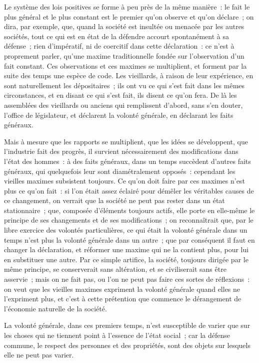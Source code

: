 \documentclass[french,twoside]{book} %
\begin{document}
Le système des lois positives se forme à peu près de la même manière : le fait le plus général et le plus constant est le premier qu’on observe et qu’on déclare ; on dira, par exemple, que, quand la société est insultée ou menacée par les autres sociétés, tout ce qui est en état de la défendre accourt spontanément à sa défense ; rien d’impératif, ni de coercitif dans cette déclaration : ce n’est à proprement parler, qu’une maxime traditionnelle fondée sur l’observation d’un fait constant. Ces observations et ces maximes se multiplient, et forment par la suite des temps une espèce de code. Les vieillards, à raison de leur expérience, en sont naturellement les dépositaires ; ils ont vu ce qui s’est fait dans les mêmes circonstances, et en disant ce qui s’est fait, ils disent ce qu’on fera. De là les assemblées des vieillards ou anciens qui remplissent d’abord, sans s’en douter, l’office de législateur, et déclarent la volonté générale, en déclarant les faits généraux.\par
Mais à mesure que les rapports se multiplient, que les idées se développent, que l’industrie fait des progrès, il survient nécessairement des modifications dans l’état des hommes : à des faits généraux, dans un temps succèdent d’autres faits généraux, qui quelquefois leur sont diamétralement opposés : cependant les vieilles maximes subsistent toujours. Ce qu’on doit faire par ces maximes n’est plus ce qu’on fait : si l’on était assez éclairé pour démêler les véritables causes de ce changement, on verrait que la société ne peut pas rester dans un état stationnaire ; que, composée d’éléments toujours actifs, elle porte en elle-même le principe de ses changements et de ses modifications ; on reconnaîtrait que, par le libre exercice des volontés particulières, ce qui était la volonté générale dans un temps n’est plus la volonté générale dans un autre ; que par conséquent il faut en changer la déclaration, et réformer une maxime qui ne la contient plus, pour lui en substituer une autre. Par ce simple artifice, la société, toujours dirigée par le même principe, se conserverait sans altération, et se civiliserait sans être asservie ; mais on ne fait pas, ou l’on ne peut pas faire ces sortes de réflexions : on veut que les vieilles maximes expriment la volonté générale quand elles ne l’expriment plus, et c’est à cette prétention que commence le dérangement de l’économie naturelle de la société.\par
La volonté générale, dans ces premiers temps, n’est susceptible de varier que sur les choses qui ne tiennent point à l’essence de l’état social ; car la défense commune, le respect des personnes et des propriétés, sont des objets sur lesquels elle ne peut pas varier.\par
\end{document}
